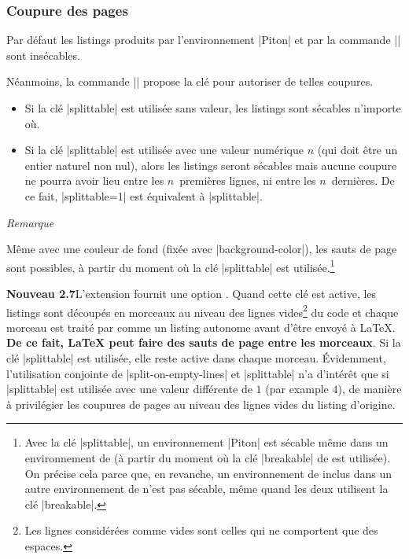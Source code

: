 \documentclass[dvipsnames,svgnames]{article}
\begin{document}
\subsubsection{Coupure des pages}


Par défaut les listings produits par l'environnement |{Piton}| et par la commande |\PitonInputFile| sont
insécables.

Néanmoins, la commande |\PitonOptions| propose la clé  pour autoriser de telles coupures.

\begin{itemize}
\item Si la clé |splittable| est utilisée sans valeur, les listings sont sécables n'importe où.

\item Si la clé |splittable| est utilisée avec une valeur numérique $n$ (qui doit être un entier naturel non nul),
alors les listings seront sécables mais aucune coupure ne pourra avoir lieu entre les $n$~premières lignes, ni
entre les $n$~dernières. De ce fait, |splittable=1| est équivalent à |splittable|.
\end{itemize}

\medskip
\emph{Remarque}\par\nobreak

Même avec une couleur de fond (fixée avec |background-color|), les sauts de page sont possibles, à partir du moment
où la clé |splittable| est utilisée.\footnote{Avec la clé |splittable|, un environnement |{Piton}| est sécable même dans un environnement de
   (à partir du moment où la clé |breakable| de  est utilisée). On précise cela parce
  que, en revanche, un environnement de  inclus dans un autre environnement de  n'est
  pas sécable, même quand les deux utilisent la clé |breakable|.}


\bigskip
{}
\colorbox{yellow!50}{\textbf{Nouveau 2.7}}\enskip L'extension  fournit une option
. Quand cette clé est active, les listings sont découpés en morceaux au niveau des
lignes vides\footnote{Les lignes considérées comme vides sont celles qui ne comportent que des espaces.} du code et
chaque morceau est traité par  comme un listing autonome avant d'être envoyé à 
LaTeX. \textbf{De ce fait, LaTeX peut faire des sauts de page entre les morceaux}. Si la clé |splittable| est
utilisée, elle reste active dans chaque morceau. Évidemment, l'utilisation conjointe de |split-on-empty-lines| et
|splittable| n'a d'intérêt que si |splittable| est utilisée avec une valeur différente de $1$ (par example $4$), de
manière à privilégier les coupures de pages au niveau des lignes vides du listing d'origine.
\end{document}
